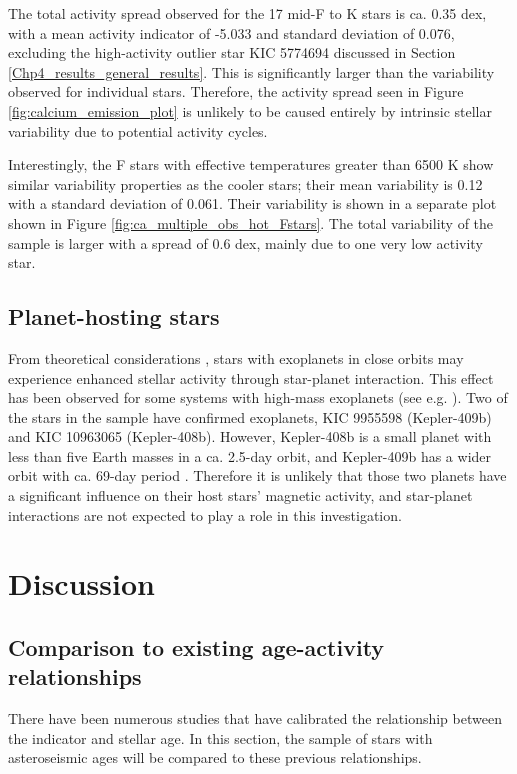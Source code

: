 The total activity spread observed for the 17 mid-F to K stars is ca. 0.35 dex, with a mean \Rprime activity indicator of -5.033 and standard deviation of 0.076, excluding the high-activity outlier star KIC 5774694 discussed in Section \ref{Chp4_results_general_results}. This is significantly larger than the variability observed for individual stars. Therefore, the activity spread seen in Figure \ref{fig:calcium_emission_plot} is unlikely to be caused entirely by intrinsic stellar variability due to potential activity cycles.

Interestingly, the F stars with effective temperatures greater than 6500 K show similar variability properties as the cooler stars; their mean variability is 0.12 with a standard deviation of 0.061. Their variability is shown in a separate plot shown in Figure \ref{fig:ca_multiple_obs_hot_Fstars}. The total variability of the sample is larger with a spread of 0.6 dex, mainly due to one very low activity star.


\subsection{Planet-hosting stars}
From theoretical considerations \citep{Cuntz_etal_2000}, stars with exoplanets in close orbits may experience enhanced stellar activity through star-planet interaction. This effect has been observed for some systems with high-mass exoplanets (see e.g. \citealt{Poppenhaeger_Wolk_2014,Pillitteri_etal_2015}). Two of the stars in the sample have confirmed exoplanets, KIC 9955598 (Kepler-409b) and KIC 10963065 (Kepler-408b). However, Kepler-408b is a small planet with less than five Earth masses in a ca. 2.5-day orbit, and Kepler-409b has a wider orbit with ca. 69-day period \citep{Marcy_etal_2014}. Therefore it is unlikely that those two planets have a significant influence on their host stars' magnetic activity, and star-planet interactions are not expected to play a role in this investigation.

\section{Discussion}
\label{Chp4_discussion}

\subsection{Comparison to existing age-activity relationships}
\label{Chp4_discus_previous_relations}
There have been numerous studies that have calibrated the relationship between the \Rprime indicator and stellar age. In this section, the sample of stars with asteroseismic ages will be compared to these previous relationships.

